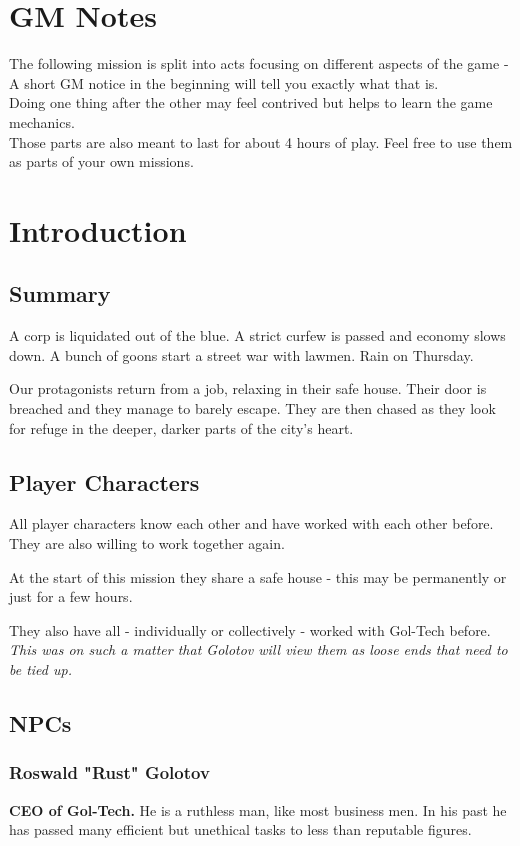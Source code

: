 \documentclass[12pt,a4paper,openany]{book}
\begin{document}
	
	
	\chapter{GM Notes}
		The following mission is split into acts focusing on different aspects of the game -
		A short GM notice in the beginning will tell you exactly what that is.
		\\
		Doing one thing after the other may feel contrived but helps to learn the game mechanics.
		\\
		Those parts are also meant to last for about 4 hours of play. Feel free to use them as parts of your own missions.
	\chapter{Introduction}
	\section{Summary}
		A corp is liquidated out of the blue. A strict curfew is passed and economy slows down. A bunch of goons start a street war with lawmen. Rain on Thursday.
		\par
		Our protagonists return from a job, relaxing in their safe house. Their door is breached and they manage to barely escape. They are then chased as they look for refuge in the deeper, darker parts of the city's heart.
		\par
		
	\section{Player Characters}
		All player characters know each other and have worked with each other before. They are also willing to work together again.
		\par
		At the start of this mission they share a safe house - this may be permanently or just for a few hours.
		\par
		They also have all - individually or collectively - worked with Gol-Tech before. \emph{This was on such a matter that Golotov will view them as loose ends that need to be tied up.}
	\section{NPCs}
		\subsection{Roswald "Rust" Golotov}
		\textbf{CEO of Gol-Tech.}
		He is a ruthless man, like most business men. In his past he has passed many efficient but unethical tasks to less than reputable figures.
	
\end{document}
